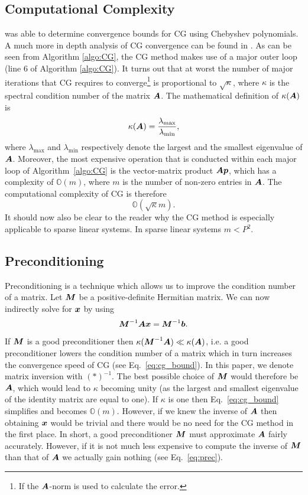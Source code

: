 \documentclass[useAMS,usenatbib]{mn2e}
\newcommand{\bA}{\bmath{A}}
\newcommand{\bM}{\bmath{M}}
\newcommand{\bb}{\bmath{b}}
\newcommand{\bx}{\bmath{x}}
\newcommand{\bp}{\bmath{p}}
\begin{document}
\subsection{Computational Complexity}
\citet{Kaniel1966} was able to determine convergence bounds for CG using Chebyshev polynomials. A much more in depth analysis of CG convergence can be found in
\citep{Sluis1986}. As can be seen from Algorithm \ref{algo:CG}, the CG method makes use of a major outer loop (line 6 of Algorithm \ref{algo:CG}). It turns out that at worst 
the number of major iterations that CG requires to converge\footnote{If the $\bA$-norm is used to calculate the error.} is proportional to $\sqrt{\kappa}$, where $\kappa$ is the spectral condition number of the matrix $\bA$.
The mathematical definition of $\kappa(\bA)$ is
\begin{equation}
\label{eq:kappa}
\kappa(\bA) = \frac{\lambda_{\textrm{max}}}{\lambda_{\textrm{min}}}, 
\end{equation}
where $\lambda_{\textrm{max}}$ and $\lambda_{\textrm{min}}$ respectively denote the largest and the smallest eigenvalue of $\bA$.
Moreover, the most expensive operation that is conducted within each major loop of Algorithm~\ref{algo:CG} is the vector-matrix product $\bA\bp$, which has a complexity of $\mathbb{O}(m)$, where $m$ is the number of non-zero entries in $\bA$.
The computational complexity of CG is therefore 
\begin{equation}
\label{eq:cg_bound}
\mathbb{O}(\sqrt{\kappa}m). 
\end{equation}
It should now also be clear to the reader why the CG method is especially applicable to sparse linear systems. In sparse linear systems $m < P^2$.

\subsection{Preconditioning}
\label{sec:precon}
Preconditioning is a technique which allows us to improve the condition number of a matrix. Let $\bM$ be a positive-definite Hermitian matrix.
We can now indirectly solve for $\bx$ by using 
\begin{equation}
\label{eq:prec}
\bM^{-1}\bA\bx = \bM^{-1}\bb.
\end{equation}
If $\bM$ is a good preconditioner then $\kappa(\bM^{-1}\bA) \ll \kappa(\bA)$, i.e. a good preconditioner lowers the condition number of a matrix which in turn increases the convergence speed 
of CG (see Eq.~\eqref{eq:cg_bound}). In this paper, we denote matrix inversion with $(*)^{-1}$. The best possible choice of $\bM$ would therefore be $\bA$, which would lead to $\kappa$ becoming unity (as the largest and smallest eigenvalue of the identity matrix are equal to one).
If $\kappa$ is one then Eq.~\eqref{eq:cg_bound} simplifies and becomes $\mathbb{O}(m)$. However, if we knew the inverse of $\bA$ then obtaining $\bx$ would be trivial and there would be no need for the CG method in the first place. 
In short, a good preconditioner $\bM$ must approximate $\bA$ fairly accurately. However, if it is not much less expensive to 
compute the inverse of $\bM$ than that of $\bA$ we actually gain nothing (see Eq.~\eqref{eq:prec}).  
\end{document}
